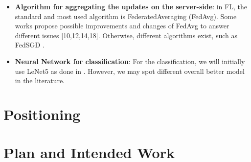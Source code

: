\documentclass{article}
\begin{document}
\begin{itemize}
    \item \textbf{Algorithm for aggregating the updates on the server-side}: in FL, the standard and most
used algorithm is FederatedAveraging (FedAvg). Some works propose possible improvements and changes of FedAvg to answer different issues \cite{DBLP:journals/corr/abs-1812-06127}[10,12,14,18]. Otherwise, different algorithms exist, such as FedSGD \cite{pmlr-v54-mcmahan17a}.
\item \textbf{Neural Network for classification}: For the classification, we will initially use LeNet5 as done in \cite{DBLP:journals/corr/abs-2003-08082}. However, we may spot different overall better model in the literature.
\end{itemize}





\section{Positioning}

\section{Plan and Intended Work}
\newpage
\printbibliography
\end{document}
